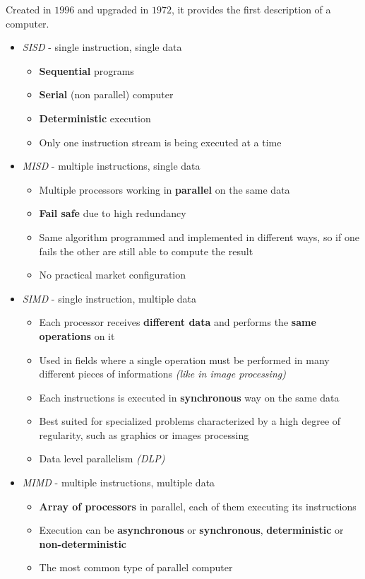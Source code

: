 \documentclass[english]{article}
\begin{document}
Created in \(1996\) and upgraded in \(1972\), it provides the first description of a computer.

\begin{itemize}
  \item \textit{SISD} - single instruction, single data
        \begin{itemize}
          \item \textbf{Sequential} programs
          \item \textbf{Serial} (non parallel) computer
          \item \textbf{Deterministic} execution
          \item Only one instruction stream is being executed at a time
        \end{itemize}
  \item \textit{MISD} - multiple instructions, single data
        \begin{itemize}
          \item Multiple processors working in \textbf{parallel} on the same data
          \item \textbf{Fail safe} due to high redundancy
          \item Same algorithm programmed and implemented in different ways, so if one fails the other are still able to compute the result
          \item No practical market configuration
        \end{itemize}
  \item \textit{SIMD} - single instruction, multiple data
        \begin{itemize}
          \item Each processor receives \textbf{different data} and performs the \textbf{same operations} on it
          \item Used in fields where a single operation must be performed in many different pieces of informations \textit{(like in image processing)}
          \item Each instructions is executed in \textbf{synchronous} way on the same data
          \item Best suited for specialized problems characterized by a high degree of regularity, such as graphics or images processing
          \item Data level parallelism \textit{(DLP)}
        \end{itemize}
  \item \textit{MIMD} - multiple instructions, multiple data
        \begin{itemize}
          \item \textbf{Array of processors} in parallel, each of them executing its instructions
          \item Execution can be \textbf{asynchronous} or \textbf{synchronous}, \textbf{deterministic} or \textbf{non-deterministic}
          \item The most common type of parallel computer
        \end{itemize}
\end{itemize}
\end{document}
